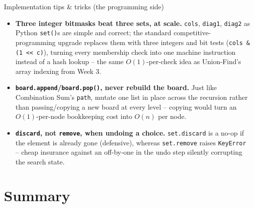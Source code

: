 \documentclass[11pt,aspectratio=169]{beamer}
\begin{document}
\begin{frame}{Implementation tips \& tricks (the programming side)}
  \small
  \begin{itemize}
    \item \textbf{Three integer bitmasks beat three sets, at scale.} \texttt{cols},
    \texttt{diag1}, \texttt{diag2} as Python \texttt{set()}s are simple and correct;
    the standard competitive-programming upgrade replaces them with three integers and
    bit tests (\texttt{cols \& (1 << c)}), turning every membership check into one
    machine instruction instead of a hash lookup -- the same $O(1)$-per-check idea as
    Union-Find's array indexing from Week 3.
    \item \textbf{\texttt{board.append}/\texttt{board.pop()}, never rebuild the board.}
    Just like Combination Sum's \texttt{path}, mutate one list in place across the
    recursion rather than passing/copying a new board at every level -- copying would
    turn an $O(1)$-per-node bookkeeping cost into $O(n)$ per node.
    \item \textbf{\texttt{discard}, not \texttt{remove}, when undoing a choice.}
    \texttt{set.discard} is a no-op if the element is already gone (defensive), whereas
    \texttt{set.remove} raises \texttt{KeyError} -- cheap insurance against an
    off-by-one in the undo step silently corrupting the search state.
  \end{itemize}
\end{frame}

\section{Summary}
\end{document}
